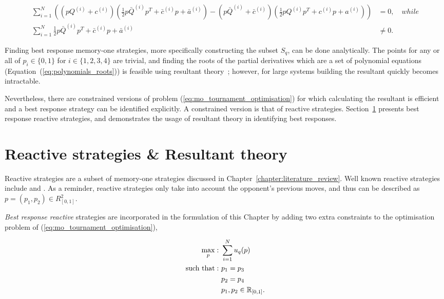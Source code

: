 {\scriptsize
\begin{align}\label{eq:polynomials_roots}
    \displaystyle\sum\limits_{i=1} ^ {N} \left(
    \left(pQ^{(i)} + c^{(i)}\right) \left(\frac{1}{2} p\bar{Q}^{(i)} p^T + \bar{c}^{(i)} p + \bar{a}^ {(i)}\right)
    - \left(p\bar{Q}^{(i)} + \bar{c}^{(i)}\right) \left(\frac{1}{2} pQ^{(i)} p^T + c^{(i)} p + a^ {(i)}\right)\right)
    &= 0, \quad {while} \\
    \displaystyle\sum\limits_{i=1} ^ {N} \frac{1}{2} p\bar{Q}^{(i)} p^T + \bar{c}^{(i)} p + \bar{a}^ {(i)} &\neq 0.
\end{align}}

Finding best response memory-one strategies, more specifically constructing the
subset \(S_q\), can be done analytically. The points for any or all of \(p_i \in
\{0, 1\}\) for \(i \in \{1, 2, 3, 4\}\) are trivial, and finding the
roots of the partial derivatives which are a set of polynomial equations
(Equation~(\ref{eq:polynomials_roots})) is feasible using resultant
theory~\cite{Jonsson2005}; however, for large systems building the resultant
quickly becomes intractable.

Nevertheless, there are constrained versions of problem
(\ref{eq:mo_tournament_optimisation}) for which calculating
the resultant is efficient and a best response strategy can be identified
explicitly. A constrained version is that of reactive strategies.
Section~\ref{section:reactive_strategies} presents best response
reactive strategies, and demonstrates the usage of resultant theory in
identifying best responses.

\section{Reactive strategies \& Resultant theory}\label{section:reactive_strategies}

Reactive strategies are a subset of memory-one strategies discussed
in Chapter~\ref{chapter:literature_review}. Well known reactive strategies
include \TitForTat and \GenerousTitForTat. As a reminder, reactive strategies
only take into account the opponent's previous moves, and thus can be described
as \(p = (p_1, p_2) \in R^{2}_{[0, 1]}\).

\textit{Best response reactive} strategies are incorporated in the formulation of
this Chapter by adding two extra constraints to the
optimisation problem of (\ref{eq:mo_tournament_optimisation}),

\begin{equation}\label{eq:reactive_tournament_optimisation}
\begin{aligned}
\max_p: & \ \sum_{i=1} ^ N u_q(p)
\\
\text{such that}: & \ p_1 = p_3 \\
                  & \ p_2 = p_4\\
                  & \ p_1, p_2 \in \mathbb{R}_{[0, 1]}.
\end{aligned}
\end{equation}

